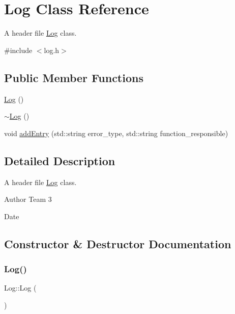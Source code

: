 \hypertarget{classLog}{}\section{Log Class Reference}
\label{classLog}


A header file \hyperlink{classLog}{Log} class.  




{\ttfamily \#include $<$log.\+h$>$}

\subsection*{Public Member Functions}
\begin{DoxyCompactItemize}
\item 
\hyperlink{classLog_af6071a60aa52b6c1b511f99b4bc1b8fe}{Log} ()
\item 
\hyperlink{classLog_a0fbfda88fbee5027c89f6eb121059360}{$\sim$\+Log} ()
\item 
void \hyperlink{classLog_a1ccb79c34552336f3bd399b7c9b035d7}{add\+Entry} (std\+::string error\+\_\+type, std\+::string function\+\_\+responsible)
\end{DoxyCompactItemize}


\subsection{Detailed Description}
A header file \hyperlink{classLog}{Log} class. 

\begin{DoxyAuthor}{Author}
Team 3 
\end{DoxyAuthor}
\begin{DoxyDate}{Date}

\end{DoxyDate}


\subsection{Constructor \& Destructor Documentation}
\mbox{\label{classLog_af6071a60aa52b6c1b511f99b4bc1b8fe}} 
\subsubsection{\texorpdfstring{Log()}{Log()}}
{\footnotesize\ttfamily Log\+::\+Log (\begin{DoxyParamCaption}{ }\end{DoxyParamCaption})}

